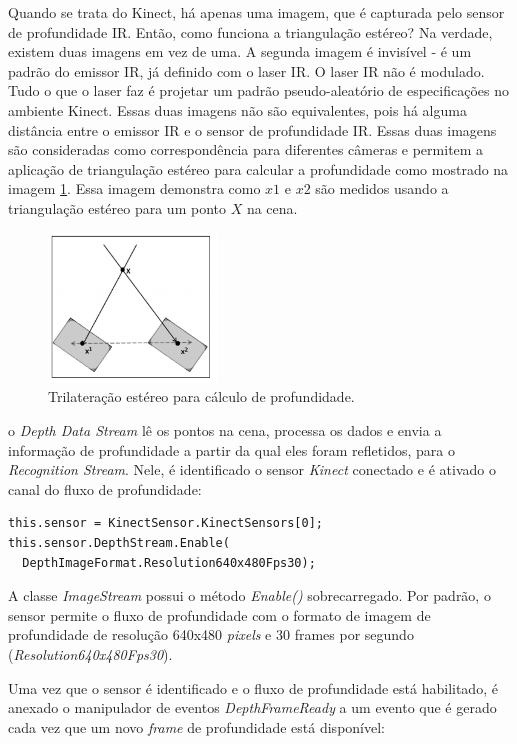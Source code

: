 Quando se trata do Kinect, há apenas uma imagem, que é capturada pelo sensor de profundidade IR. Então, como funciona a triangulação estéreo? Na verdade, existem duas imagens em vez de uma. A segunda imagem é invisível - é um padrão do emissor IR, já definido com o laser IR. O laser IR não é modulado. Tudo o que o laser faz é projetar um padrão pseudo-aleatório de especificações no ambiente Kinect. Essas duas imagens não são equivalentes, pois há alguma distância entre o emissor IR e o sensor de profundidade IR. Essas duas imagens são consideradas como correspondência para diferentes câmeras e permitem a aplicação de triangulação estéreo para calcular a profundidade como mostrado na imagem \ref{fig:trilatStereo}. Essa imagem demonstra como $x1$ e $x2$ são medidos usando a triangulação estéreo para um ponto $X$ na cena.

\begin{figure}[!h]
\centering
\includegraphics[width=0.4\textwidth]{images/trilateracao_estereo.png}
\caption{Trilateração estéreo para cálculo de profundidade.}
\label{fig:trilatStereo}
\end{figure}

o \textit{Depth Data Stream} lê os pontos na cena, processa os dados e envia a informação de profundidade a partir da qual eles foram refletidos, para o \textit{Recognition Stream}. Nele, é identificado o sensor \textit{Kinect} conectado e é ativado o canal do fluxo de profundidade:

\begin{verbatim}
this.sensor = KinectSensor.KinectSensors[0];
this.sensor.DepthStream.Enable(
  DepthImageFormat.Resolution640x480Fps30);
\end{verbatim}

A classe \textit{ImageStream} possui o método \textit{Enable()} sobrecarregado. Por padrão, o sensor permite o fluxo de profundidade com o formato de imagem de profundidade de resolução 640x480 \textit{pixels} e 30 frames por segundo (\textit{Resolution640x480Fps30}).

Uma vez que o sensor é identificado e o fluxo de profundidade está habilitado, é anexado o manipulador de eventos \textit{DepthFrameReady} a um evento que é gerado cada vez que um novo \textit{frame} de profundidade está disponível:

